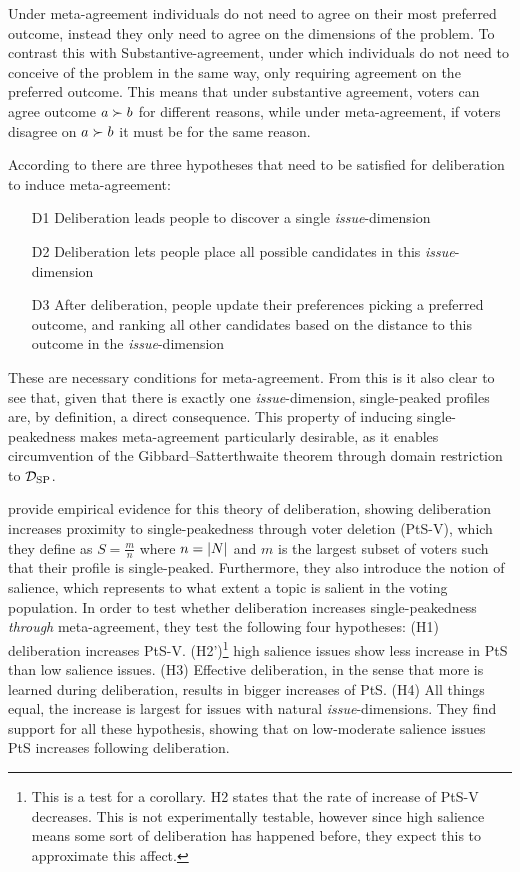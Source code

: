Under meta-agreement individuals do not need to agree on their most
preferred outcome, instead they only need to agree on the dimensions of the
problem. To contrast this with Substantive-agreement, under which individuals
do not need to conceive of the problem in the same way, only requiring
agreement on the preferred outcome. This means that under substantive
agreement, voters can agree outcome $a \succ b$ for different reasons, while
under meta-agreement, if voters disagree on $a \succ b$ it must be for the same
reason.

According to \citet{listTwoConceptsAgreement2002} there are three hypotheses that need to be satisfied for deliberation to induce meta-agreement:
\begin{enumerate}
	\label{list:meta-agreement-checklist}
	\setlength\itemsep{1px}
	\item [D1] Deliberation leads people to discover a single \emph{issue}-dimension
	\item [D2] Deliberation lets people place all possible candidates in this \emph{issue}-dimension
	\item [D3] After deliberation, people update their preferences picking
	      a preferred outcome, and ranking all other candidates based on the distance to this outcome in the \emph{issue}-dimension
\end{enumerate}

These are necessary conditions for meta-agreement. From this is it also
clear to see that, given that there is exactly one \emph{issue}-dimension,
single-peaked profiles are, by definition, a direct consequence. This property
of inducing single-peakedness makes meta-agreement particularly desirable, as
it enables circumvention of the Gibbard–Satterthwaite theorem
\citep{gibbardManipulationVotingSchemes1973,
	satterthwaiteStrategyproofnessArrowsConditions1975} through
domain restriction to $\mathcal{D}_{\textnormal{SP}}$.

\citet{listDeliberationSinglePeakednessPossibility2013} provide empirical
evidence for this theory of deliberation, showing deliberation increases
proximity to single-peakedness through voter deletion (PtS-V), which they define as $S= \frac{m}{n}$
where $n = |N|$ and $m$ is the largest subset of voters such that their
profile is single-peaked. Furthermore, they also introduce the notion of
salience, which represents to what extent a topic is salient in the voting
population. In order to test whether deliberation increases single-peakedness
\emph{through} meta-agreement, they test the following four hypotheses: (H1)
deliberation increases PtS-V. (H2')\footnote{This is a
	test for a corollary. H2 states that the rate of increase of PtS-V decreases. This is not experimentally testable, however since
	high salience means some sort of deliberation has happened before, they expect
	this to approximate this affect.} high salience issues show less increase in
PtS than low salience issues. (H3) Effective deliberation, in the sense that
more is learned during deliberation, results in bigger increases of PtS. (H4)
All things equal, the increase is largest for issues with natural
\emph{issue}-dimensions. They find support for all these hypothesis, showing
that on low-moderate salience issues PtS increases following deliberation.

